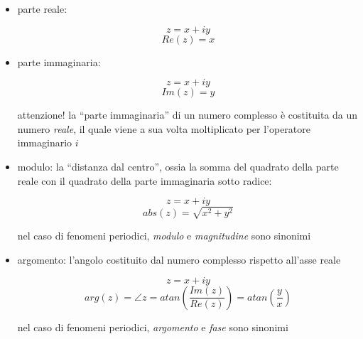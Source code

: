 \begin{itemize}

  \item parte reale:

		\begin{equation}
			z = x + i y\nonumber
		 \end{equation}
		 \begin{equation}
			Re(z) = x
		\end{equation}

	\item parte immaginaria:

		\begin{equation}
			z = x + i y\nonumber
		 \end{equation}
		 \begin{equation}
			Im(z) = y
		\end{equation}

    attenzione! la ``parte immaginaria'' di un numero complesso \`e costituita
		da un numero \emph{reale}, il quale viene a sua volta moltiplicato per
		l'operatore immaginario $i$
		

  \item modulo: la ``distanza dal centro'', ossia la somma del quadrato della
	parte reale con il quadrato della parte immaginaria sotto radice:

		 \begin{equation}
		 	z = x + i y\nonumber
		 \end{equation}
		 \begin{equation}
			abs(z) = \sqrt{x^2 + y^2}
		 \end{equation}

		 nel caso di fenomeni periodici, \emph{modulo} e \emph{magnitudine} sono
		 sinonimi

	\item argomento: l'angolo costituito dal numero complesso rispetto all'asse
	reale

		\begin{equation}
		 	z = x + i y\nonumber
		 \end{equation}
		 \begin{equation}
			arg ( z ) = \angle{z} = atan \left ( \frac{Im(z)}{Re(z)} \right ) = atan \left ( \frac{y}{x} \right )
		\end{equation}
	
		 nel caso di fenomeni periodici, \emph{argomento} e \emph{fase} sono
		 sinonimi

\end{itemize}

